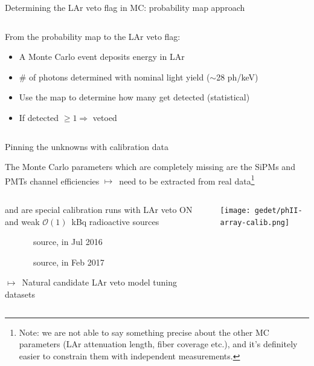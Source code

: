 \documentclass[10pt,aspectratio=169]{beamer}
\newcommand{\arrow}{$\longmapsto$}
\begin{document}
\begin{frame}{Determining the LAr veto flag in MC: probability map approach}
  \begin{columns}
    \begin{column}{0.45\textwidth}
      From the probability map to the LAr veto flag:
      \begin{itemize}
        \item A Monte Carlo event deposits energy in LAr
        \item \# of photons determined with nominal light yield ($\sim$28
          ph/keV)
        \item Use the map to determine how many get detected
          (statistical)
        \item If detected $\geq 1 \Rightarrow$ vetoed
      \end{itemize}
    \end{column}
    \begin{column}{0.55\textwidth}
      \begin{center}
      \end{center}
    \end{column}
  \end{columns}
\end{frame}
\begin{frame}{Pinning the unknowns with calibration data}
  \begin{simpleblock}
    The Monte Carlo parameters which are completely missing are the SiPMs and
    PMTs \alert{channel efficiencies} \arrow\ need to be extracted from real
    data\footnote{Note: we are not able to say something precise about the
    other MC parameters (LAr attenuation length, fiber coverage etc.), and it's
    definitely easier to constrain them with independent measurements.}
  \end{simpleblock}

  \vspace*{0.5cm}
  \begin{columns}
    \begin{column}{0.7\textwidth}\setlength{\parskip}{10pt}%
       and  are special calibration runs with LAr veto ON and
      weak $\mathcal{O}(1)$~kBq radioactive sources
      \begin{description}
        \item[] \Th\ source, in Jul 2016
        \item[] \Ra\ source, in Feb 2017
      \end{description}

      \alert{\arrow\ Natural candidate LAr veto model tuning datasets}
    \end{column}
    \begin{column}{0.25\textwidth}
      \hspace{-0.5cm}\texttt{[image: gedet/phII-array-calib.png]}
    \end{column}
  \end{columns}
\end{frame}
\end{document}
